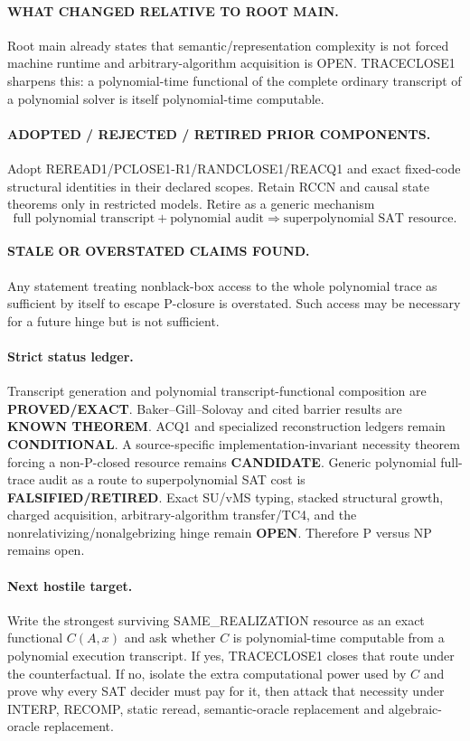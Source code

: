 \documentclass[11pt]{article}
\begin{document}
\paragraph{WHAT CHANGED RELATIVE TO ROOT MAIN.}
Root main already states that semantic/representation complexity is not forced machine runtime and arbitrary-algorithm acquisition is OPEN. TRACECLOSE1 sharpens this: a polynomial-time functional of the complete ordinary transcript of a polynomial solver is itself polynomial-time computable.

\paragraph{ADOPTED / REJECTED / RETIRED PRIOR COMPONENTS.}
Adopt REREAD1/PCLOSE1-R1/RANDCLOSE1/REACQ1 and exact fixed-code structural identities in their declared scopes. Retain RCCN and causal state theorems only in restricted models. Retire as a generic mechanism
\[
 \boxed{\text{full polynomial transcript}+\text{polynomial audit}
 \Rightarrow\text{superpolynomial SAT resource}.}
\]

\paragraph{STALE OR OVERSTATED CLAIMS FOUND.}
Any statement treating nonblack-box access to the whole polynomial trace as sufficient by itself to escape P-closure is overstated. Such access may be necessary for a future hinge but is not sufficient.

\paragraph{Strict status ledger.}
Transcript generation and polynomial transcript-functional composition are \textbf{PROVED/EXACT}. Baker--Gill--Solovay and cited barrier results are \textbf{KNOWN THEOREM}. ACQ1 and specialized reconstruction ledgers remain \textbf{CONDITIONAL}. A source-specific implementation-invariant necessity theorem forcing a non-P-closed resource remains \textbf{CANDIDATE}. Generic polynomial full-trace audit as a route to superpolynomial SAT cost is \textbf{FALSIFIED/RETIRED}. Exact SU/vMS typing, stacked structural growth, charged acquisition, arbitrary-algorithm transfer/TC4, and the nonrelativizing/nonalgebrizing hinge remain \textbf{OPEN}. Therefore P versus NP remains open.

\paragraph{Next hostile target.}
Write the strongest surviving SAME\_REALIZATION resource as an exact functional $C(A,x)$ and ask whether $C$ is polynomial-time computable from a polynomial execution transcript. If yes, TRACECLOSE1 closes that route under the counterfactual. If no, isolate the extra computational power used by $C$ and prove why every SAT decider must pay for it, then attack that necessity under INTERP, RECOMP, static reread, semantic-oracle replacement and algebraic-oracle replacement.
\end{document}
